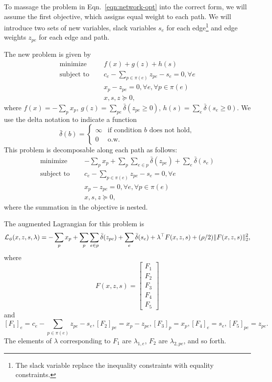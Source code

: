 \documentclass[11pt]{article}
\begin{document}
To massage the problem in Eqn.~\ref{eqn:network-opt} into the correct form,
we will assume the first objective, which assigns equal weight to each path.
We will introduce two sets of new variables, slack variables $s_e$ for each edge\footnote{
The slack variable replace the inequality constraints with equality constraints.
}
and edge weights $z_{pe}$ for each edge and path.

The new problem is given by
\begin{equation}
\label{eqn:network-opt-std}
\begin{aligned}
\textrm{minimize } \quad & f(x) + g(z) + h(s)\\
\textrm{subject to } \quad &c_e - \sum_{p\in\pi(e)}z_{pe} - s_{e} = 0, \forall e\\
&x_p - z_{pe} = 0, \forall e, \forall p \in \pi(e)\\
&x,s,z \succeq 0,
\end{aligned}
\end{equation}
where $f(x) = -\sum_p x_p$,
$g(z) = \sum_{pe} \bar\delta(z_{pe} \ge 0)$, $h(s) = \sum_{e} \bar\delta(s_{e} \ge 0)$.
We use the delta notation to indicate a function
$$
\bar\delta(b) = \begin{cases}
    \infty & \textrm{if condition } b \textrm{ does not hold},\\
    0 & \textrm{o.w.}
\end{cases}
$$
This problem is decomposable along each path as follows:
\begin{equation}
\label{eqn:network-opt-sep}
\begin{aligned}
\textrm{minimize } \quad & -\sum_p x_p + \sum_p\sum_{e \in p} \bar\delta(z_{pe}) + \sum_e \bar\delta(s_{e})\\
\textrm{subject to } \quad &c_e - \sum_{p\in\pi(e)}z_{pe} - s_{e} = 0, \forall e\\
&x_p - z_{pe} = 0, \forall e, \forall p \in \pi(e)\\
&x,s,z \succeq 0,
\end{aligned}
\end{equation}
where the summation in the objective is nested.

The augmented Lagrangian for this problem is
\begin{equation}
    \label{eqn:network-lagrangian}
    \mathcal{L}_\phi(x,z,s,\lambda) =-\sum_p x_p + \sum_p\sum_{e \in p} \bar\delta(z_{pe}) + \sum_{e} \bar\delta(s_{e})
        + \lambda^\top F(x,z,s)
    + (\rho/2)\| F(x,z,s) \|_2^2,
\end{equation}
where
$$F(x,z,s) =
\begin{bmatrix}
F_1 \\
F_2 \\
F_3 \\
F_4 \\
F_5
\end{bmatrix}
$$
and
$$
    [F_1]_e = c_e - \sum_{p\in\pi(e)}z_{pe} - s_{e},
    [F_2]_{pe} = x_p - z_{pe},
    [F_3]_p = x_p,
    [F_4]_{e} = s_{e},
    [F_5]_{pe} = z_{pe}.
$$
The elements of $\lambda$ corresponding to $F_1$ are $\lambda_{1,e}$,
$F_2$ are $\lambda_{2,pe}$, and so forth.
\end{document}

